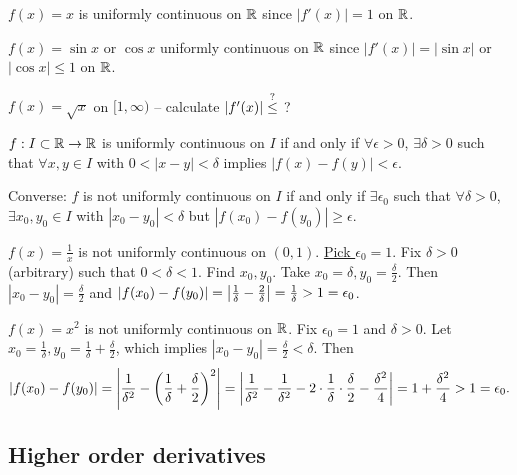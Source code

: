 \documentclass[]{article}
\begin{document}
\begin{example}
	$f(x) = x$ is uniformly continuous on $\mathbb{R}$ since $|f'(x)|=1$ on $\mathbb{R}$.
\end{example}
\begin{example}
	$f(x) = \sin x$ or $\cos x$ uniformly continuous on $\mathbb{R}$ since $|f'(x)| = |\sin x|$ or $|\cos x|\leq1$ on $\mathbb{R}$.
\end{example}
\begin{example}
	$f(x) = \sqrt x$ on $[1,\infty)$ -- calculate $|f'(x)|\overset{?}{\leq}$ ?
\end{example}

\begin{example}
	$f:I\subset\mathbb{R}\rightarrow\mathbb{R}$ is uniformly continuous on $I$ if and only if $\forall\epsilon>0$, $\exists\delta>0$ such that $\forall x,y\in I$ with $0<|x-y|<\delta$ implies $|f(x)-f(y)|<\epsilon$.

	Converse: $f$ is not uniformly continuous on $I$ if and only if $\exists \epsilon_0$ such that $\forall\delta>0$, $\exists x_0,y_0\in I$ with $|x_0-y_0|<\delta$ but $|f(x_0)-f(y_0)|\geq\epsilon$.
\end{example}
\begin{example}
	$f(x) = \frac1x$ is not uniformly continuous on $(0,1)$.
	\ul{Pick $\epsilon_0=1$}. Fix $\delta>0$ (arbitrary) such that $0<\delta<1$. Find $x_0,y_0$.
	Take $x_0=\delta,y_0=\frac\delta2$. Then $|x_0-y_0| = \frac\delta2$ and $|f(x_0)-f(y_0)| = \left|\frac1\delta-\frac2\delta\right|=\frac1\delta > 1=\epsilon_0$.
\end{example}
\begin{example}
	$f(x)=x^2$ is not uniformly continuous on $\mathbb{R}$.
	Fix $\epsilon_0=1$ and $\delta>0$.
	Let $x_0=\frac1\delta,y_0=\frac1\delta+\frac\delta2$, which implies $|x_0-y_0|=\frac\delta2<\delta$.
	Then
	\begin{align*}
		|f(x_0)-f(y_0)| = \left|\frac1{\delta^2} - \left(\frac1\delta+\frac\delta2\right)^2\right| 
						= \left|\frac1{\delta^2} - \frac1{\delta^2} - 2\cdot\frac1\delta\cdot\frac\delta2 - \frac{\delta^2}4\right|
		= 1 + \frac{\delta^2}4 > 1 = \epsilon_0.
	\end{align*}
\end{example}

\subsection*{Higher order derivatives}
\end{document}
